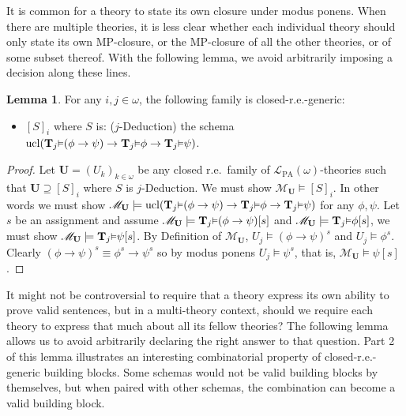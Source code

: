 \documentclass[reqno]{article}
\theoremstyle{definition}
\newtheorem{lemma}[theorem]{Lemma}
\def\L{\mathscr{L}}
\def\M{\mathscr{M}}
\def\T{\mathbf{T}}
\def\U{\mathbf{U}}
\def\LPA{\L_{\mathrm{PA}}}
\renewcommand{\Pr}[1]{\T_{#1}\mbox{\small${\vDash}$}}
\newcommand{\ucl}[1]{\mathrm{ucl}(#1)}
\begin{document}

It is common for a theory to state its own
closure under modus ponens. When there are multiple theories, it
is less clear whether each individual theory should only state its
own MP-closure, or the MP-closure
of all the other theories, or of some subset thereof.
With the following lemma, we avoid arbitrarily
imposing a decision along these lines.

\begin{lemma}
\label{firstutilbagdeduction}
For any $i,j\in\omega$, the following family is closed-r.e.-generic:
\begin{itemize}
    \item
    $[S]_i$ where $S$ is: ($j$-Deduction) the schema
    $\ucl{\Pr j(\phi\rightarrow\psi)\rightarrow \Pr j\phi\rightarrow\Pr j\psi}$.
\end{itemize}
\end{lemma}

\begin{proof}
Let $\U=(U_k)_{k\in\omega}$ be any closed r.e.~family of $\LPA(\omega)$-theories
such that $\U\supseteq [S]_i$ where $S$ is $j$-Deduction.  We must show
$\M_{\U}\models [S]_i$.  In other words we must show
$\M_{\U}\models \ucl{\Pr j (\phi\rightarrow\psi)
\rightarrow \Pr j\phi \rightarrow \Pr j \psi}$ for any $\phi,\psi$.
Let $s$ be an assignment and assume $\M_{\U}\models \Pr j (\phi\rightarrow\psi)[s]$
and $\M_{\U}\models \Pr j \phi[s]$, we must show $\M_{\U}\models \Pr j \psi[s]$.
By Definition of $\M_{\U}$, $U_j\models (\phi\rightarrow\psi)^s$ and
$U_j\models \phi^s$.  Clearly $(\phi\rightarrow\psi)^s\equiv
\phi^s\rightarrow\psi^s$ so by modus ponens $U_j\models\psi^s$, that is,
$\M_{\U}\models \psi[s]$.
\end{proof}

It might not be controversial to require that a theory express its own
ability to prove valid sentences, but in a multi-theory context, should
we require each theory to express that much about all its fellow theories?
The following lemma allows us to avoid arbitrarily declaring the right
answer to that question. Part 2 of this lemma illustrates an interesting combinatorial
property of closed-r.e.-generic building blocks. Some schemas would not be
valid building blocks by themselves, but when paired with other schemas,
the combination can become a valid building block.
\end{document}
